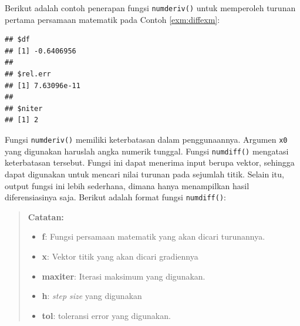 \documentclass[]{book}
\newenvironment{Shaded}{\begin{snugshade}}{\end{snugshade}}
\newcommand{\ControlFlowTok}[1]{\textcolor[rgb]{0.13,0.29,0.53}{\textbf{#1}}}
\newcommand{\DataTypeTok}[1]{\textcolor[rgb]{0.13,0.29,0.53}{#1}}
\newcommand{\DecValTok}[1]{\textcolor[rgb]{0.00,0.00,0.81}{#1}}
\newcommand{\KeywordTok}[1]{\textcolor[rgb]{0.13,0.29,0.53}{\textbf{#1}}}
\newcommand{\NormalTok}[1]{#1}
\newcommand{\OperatorTok}[1]{\textcolor[rgb]{0.81,0.36,0.00}{\textbf{#1}}}
\providecommand{\tightlist}{%
  \setlength{\itemsep}{0pt}\setlength{\parskip}{0pt}}
\theoremstyle{definition}
\theoremstyle{definition}
\theoremstyle{definition}
\theoremstyle{remark}
\begin{document}
Berikut adalah contoh penerapan fungsi \texttt{numderiv()} untuk memperoleh turunan pertama persamaan matematik pada Contoh \ref{exm:diffexm}:

\begin{Shaded}
\end{Shaded}

\begin{verbatim}
## $df
## [1] -0.6406956
## 
## $rel.err
## [1] 7.63096e-11
## 
## $niter
## [1] 2
\end{verbatim}

Fungsi \texttt{numderiv()} memiliki keterbatasan dalam penggunaannya. Argumen \texttt{x0} yang digunakan haruslah angka numerik tunggal. Fungsi \texttt{numdiff()} mengatasi keterbatasan tersebut. Fungsi ini dapat menerima input berupa vektor, sehingga dapat digunakan untuk mencari nilai turunan pada sejumlah titik. Selain itu, output fungsi ini lebih sederhana, dimana hanya menampilkan hasil diferensiasinya saja. Berikut adalah format fungsi \texttt{numdiff()}:

\begin{Shaded}
\end{Shaded}

\begin{quote}
\textbf{Catatan:}

\begin{itemize}
\tightlist
\item
  \textbf{f}: Fungsi persamaan matematik yang akan dicari turunannya.
\item
  \textbf{x}: Vektor titik yang akan dicari gradiennya
\item
  \textbf{maxiter}: Iterasi maksimum yang digunakan.
\item
  \textbf{h}: \emph{step size} yang digunakan
\item
  \textbf{tol}: toleransi error yang digunakan.
\end{itemize}
\end{quote}
\end{document}
